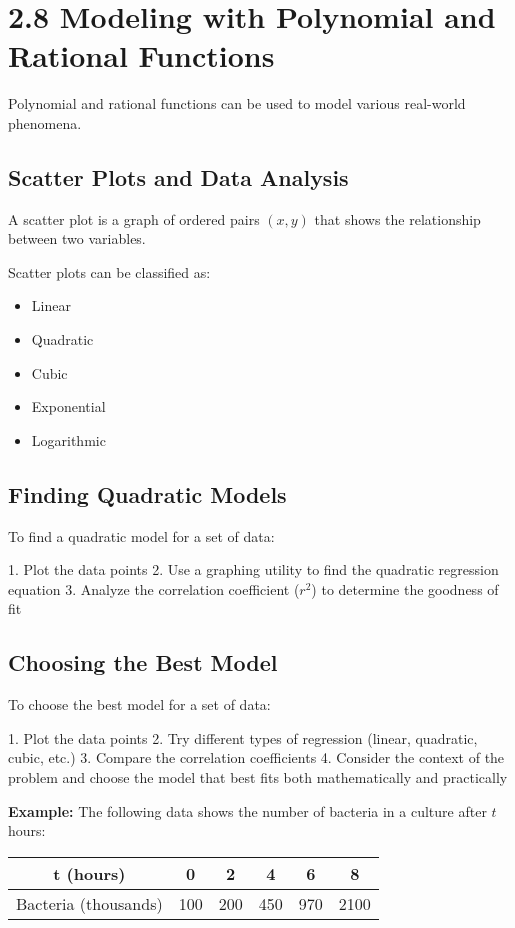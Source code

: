 \documentclass[12pt]{article}
\begin{document}
\section{2.8 Modeling with Polynomial and Rational Functions}

Polynomial and rational functions can be used to model various real-world phenomena.

\subsection{Scatter Plots and Data Analysis}

A scatter plot is a graph of ordered pairs $(x, y)$ that shows the relationship between two variables.

Scatter plots can be classified as:
\begin{itemize}
    \item Linear
    \item Quadratic
    \item Cubic
    \item Exponential
    \item Logarithmic
\end{itemize}

\subsection{Finding Quadratic Models}

To find a quadratic model for a set of data:

1. Plot the data points
2. Use a graphing utility to find the quadratic regression equation
3. Analyze the correlation coefficient ($r^2$) to determine the goodness of fit

\subsection{Choosing the Best Model}

To choose the best model for a set of data:

1. Plot the data points
2. Try different types of regression (linear, quadratic, cubic, etc.)
3. Compare the correlation coefficients
4. Consider the context of the problem and choose the model that best fits both mathematically and practically

\textbf{Example:} The following data shows the number of bacteria in a culture after $t$ hours:

\begin{center}
\begin{tabular}{|c|c|c|c|c|c|}
\hline
t (hours) & 0 & 2 & 4 & 6 & 8 \\
\hline
Bacteria (thousands) & 100 & 200 & 450 & 970 & 2100 \\
\hline
\end{tabular}
\end{center}
\end{document}
